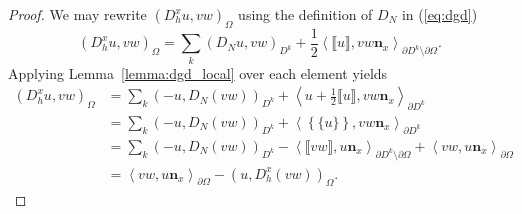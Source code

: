 \documentclass[preprint,10pt]{article}
\theoremstyle{definition}
\theoremstyle{lemma}
\theoremstyle{theorem}
\theoremstyle{assumption}
\newcommand{\pd}[2]{\frac{\partial#1}{\partial#2}}
\newcommand{\LRp}[1]{\left( #1 \right)}
\newcommand{\LRa}[1]{\left\langle #1 \right\rangle}
\newcommand{\LRc}[1]{\left\{ #1 \right\}}
\newcommand{\jump}[1] {\ensuremath{\llbracket#1\rrbracket}}
\newcommand{\avg}[1] {\ensuremath{\LRc{\!\{#1\}\!}}}
\begin{document}
\begin{proof}
We may rewrite $\LRp{D^x_h u,vw}_{\Omega}$ using the definition of $D_N$ in (\ref{eq:dgd})
\[
\LRp{D^x_h u,vw}_{\Omega} = \sum_k \LRp{D_N u,vw}_{D^k} + \frac{1}{2}\LRa{\jump{u},vw\bm{n}_x}_{\partial D^k \setminus \partial \Omega}.  
\]
Applying Lemma~\ref{lemma:dgd_local} over each element yields 
\begin{align*}
\LRp{D^x_h u,vw}_{\Omega} &= \sum_k \LRp{-u,D_N (vw)}_{D^k} + \LRa{u + \frac{1}{2}\jump{u},vw\bm{n}_x}_{\partial D^k}\\
&= \sum_k \LRp{-u,D_N (vw)}_{D^k} + \LRa{\avg{u},vw\bm{n}_x}_{\partial D^k}\\
&= \sum_k \LRp{-u,D_N (vw)}_{D^k} - \LRa{\jump{vw},u\bm{n}_x}_{\partial D^k \setminus \partial \Omega} + \LRa{vw,u\bm{n}_x}_{\partial \Omega} \\
&= \LRa{vw,u\bm{n}_x}_{\partial \Omega}-\LRp{u,D^x_h (vw)}_{\Omega}.    
\end{align*}
\end{proof}
\end{document}
